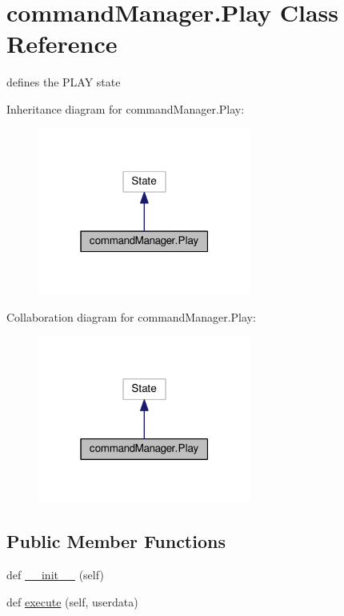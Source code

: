 \hypertarget{classcommandManager_1_1Play}{}\section{command\+Manager.\+Play Class Reference}
\label{classcommandManager_1_1Play}


defines the P\+L\+AY state  




Inheritance diagram for command\+Manager.\+Play\+:
\nopagebreak
\begin{figure}[H]
\begin{center}
\leavevmode
\includegraphics[width=199pt]{classcommandManager_1_1Play__inherit__graph}
\end{center}
\end{figure}


Collaboration diagram for command\+Manager.\+Play\+:
\nopagebreak
\begin{figure}[H]
\begin{center}
\leavevmode
\includegraphics[width=199pt]{classcommandManager_1_1Play__coll__graph}
\end{center}
\end{figure}
\subsection*{Public Member Functions}
\begin{DoxyCompactItemize}
\item 
def \hyperlink{classcommandManager_1_1Play_a4bc5c3700d80432b4dd09b163f210540}{\+\_\+\+\_\+init\+\_\+\+\_\+} (self)
\item 
def \hyperlink{classcommandManager_1_1Play_a2ec6a287ce47f3f6c08c76cc452cf4d3}{execute} (self, userdata)
\end{DoxyCompactItemize}

